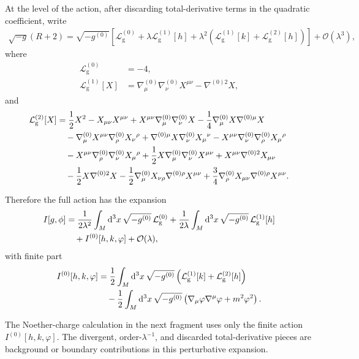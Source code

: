 \documentclass[11pt]{article}
\newcommand{\dd}{\mathrm{d}}
\newcommand{\cO}{\mathcal{O}}
\newcommand{\Lg}{\mathcal{L}_{\mathrm g}}
\begin{document}
At the level of the action, after discarding total-derivative terms in the
quadratic coefficient, write
\begin{align}
  \sqrt{-g}(R+2)
  =\sqrt{-g^{(0)}}\left[
    \Lg^{(0)}
    +\lambda \Lg^{(1)}[h]
    +\lambda^2\left(\Lg^{(1)}[k]+\Lg^{(2)}[h]\right)
  \right]+\cO(\lambda^3),
\end{align}
where
\begin{align}
  \Lg^{(0)}&=-4,\\
  \Lg^{(1)}[X]
  &=\nabla^{(0)}_\mu\nabla^{(0)}_\nu X^{\mu\nu}
    -\nabla^{(0)2}X,
\end{align}
and
\begin{align}
  \Lg^{(2)}[X]
  &=\frac12 X^2-X_{\mu\nu}X^{\mu\nu}
    +X^{\mu\nu}\nabla^{(0)}_\mu\nabla^{(0)}_\nu X
    -\frac14\nabla^{(0)}_\mu X\nabla^{(0)\mu}X \notag\\
  &\quad
    -\nabla^{(0)}_\mu X^{\mu\nu}
      \nabla^{(0)}_\rho X_\nu{}^\rho
    +\nabla^{(0)\mu}X
      \nabla^{(0)}_\nu X_\mu{}^\nu
    -X^{\mu\nu}
      \nabla^{(0)}_\nu\nabla^{(0)}_\rho X_\mu{}^\rho \notag\\
  &\quad
    -X^{\mu\nu}
      \nabla^{(0)}_\rho\nabla^{(0)}_\nu X_\mu{}^\rho
    +\frac12 X
      \nabla^{(0)}_\mu\nabla^{(0)}_\nu X^{\mu\nu}
    +X^{\mu\nu}\nabla^{(0)2}X_{\mu\nu} \notag\\
  &\quad
    -\frac12 X\nabla^{(0)2}X
    -\frac12\nabla^{(0)}_\mu X_{\nu\rho}
      \nabla^{(0)\rho}X^{\mu\nu}
    +\frac34\nabla^{(0)}_\rho X_{\mu\nu}
      \nabla^{(0)\rho}X^{\mu\nu}.
\end{align}

Therefore the full action has the expansion
\begin{align}
  I[g,\phi]
  &=\frac{1}{2\lambda^2}
    \int_M\dd^3x\,\sqrt{-g^{(0)}}\,\Lg^{(0)}
    +\frac{1}{2\lambda}
    \int_M\dd^3x\,\sqrt{-g^{(0)}}\,\Lg^{(1)}[h]
    \notag\\
  &\quad
    +I^{(0)}[h,k,\varphi]+\cO(\lambda),
\end{align}
with finite part
\begin{align}
  I^{(0)}[h,k,\varphi]
  &=\frac12\int_M\dd^3x\,\sqrt{-g^{(0)}}
    \left(\Lg^{(1)}[k]+\Lg^{(2)}[h]\right)
    \notag\\
  &\quad
    -\frac12\int_M\dd^3x\,\sqrt{-g^{(0)}}
    \left(\nabla_\mu\varphi\nabla^\mu\varphi+m^2\varphi^2\right).
\end{align}

The Noether-charge calculation in the next fragment uses only the finite
action $I^{(0)}[h,k,\varphi]$. The divergent, order-$\lambda^{-1}$, and
discarded total-derivative pieces are background or boundary contributions in
this perturbative expansion.
\end{document}
